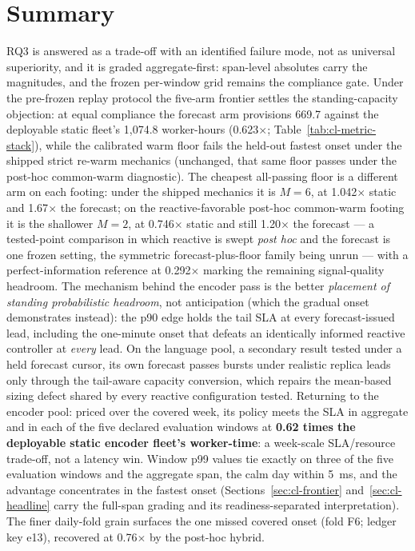 \section{Summary}
\label{sec:cl-summary}

RQ3 is answered as a trade-off with an identified failure mode, not as
universal superiority, and it is graded aggregate-first: span-level
absolutes carry the magnitudes, and the frozen per-window grid remains the
compliance gate. Under the pre-frozen replay protocol the
five-arm frontier settles the standing-capacity objection: at equal compliance
the forecast arm provisions 669.7 against the deployable static fleet's
1{,}074.8 worker-hours (0.623$\times$; Table~\ref{tab:cl-metric-stack}), while the
calibrated warm floor fails the held-out fastest onset under the shipped
strict re-warm mechanics (unchanged, that same floor passes under the
post-hoc common-warm diagnostic). The cheapest all-passing floor is a
different arm on each footing: under the shipped mechanics it is $M{=}6$, at
1.042$\times$ static and 1.67$\times$ the forecast; on the reactive-favorable
post-hoc common-warm footing it is the shallower $M{=}2$, at 0.746$\times$
static and still 1.20$\times$ the forecast --- a
tested-point comparison in which reactive is swept \emph{post hoc} and the
forecast is one frozen setting, the symmetric forecast-plus-floor family
being unrun --- with a
perfect-information reference at 0.292$\times$ marking the remaining
signal-quality headroom. The mechanism behind the encoder pass is the
better \emph{placement of standing probabilistic headroom}, not
anticipation (which the gradual onset demonstrates instead): the p90 edge
holds the tail SLA at every forecast-issued lead, including the one-minute
onset that defeats an identically informed reactive controller at
\emph{every} lead. On the language pool, a secondary result tested
under a held forecast cursor, its own forecast passes bursts under realistic
replica leads only through the tail-aware capacity conversion, which repairs
the mean-based sizing defect shared by every reactive configuration tested.
Returning to the encoder pool: priced over the covered week, its policy
meets the SLA in aggregate and in each
of the five declared evaluation windows at \textbf{0.62 times the
deployable static encoder fleet's worker-time}: a week-scale SLA/resource
trade-off, not a latency win. Window p99 values tie exactly on three of
the five evaluation windows and the aggregate span, the calm day within \SI{5}{\milli\second}, and the
advantage concentrates in the fastest onset
(Sections~\ref{sec:cl-frontier} and~\ref{sec:cl-headline} carry the
full-span grading and its readiness-separated interpretation). The finer daily-fold grain surfaces
the one missed covered onset (fold F6; ledger key e13), recovered at
0.76$\times$ by the post-hoc hybrid.
